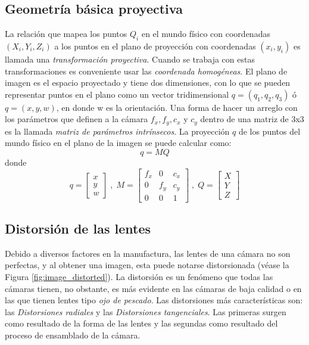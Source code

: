 \documentclass{book}
\begin{document}
\subsection{Geometría básica proyectiva}
La relación que mapea los puntos $Q_{i}$ en el mundo físico con coordenadas $(X_{i},Y_{i},Z_{i})$ a los puntos en el plano de proyección con coordenadas $(x_{i},y_{i})$ es llamada una \textit{transformación proyectiva}. Cuando se trabaja con estas transformaciones es conveniente usar las \textit{coordenada homogéneas}. El plano de imagen es el espacio proyectado y tiene dos dimensiones, con lo que se pueden representar puntos en el plano como un vector tridimensional $q=(q_{1},q_{2},q_{3})$ ó $q=(x, y, w)$, en donde w es la orientación. Una forma de hacer un arreglo con los parámetros que definen a la cámara $f_{x},f_{y},c_{x}$ y $c_{y}$ dentro de una matriz de 3x3 es la llamada \textit{matriz de parámetros intrínsecos}. La proyección $q$ de los puntos del mundo físico en el plano de la imagen se puede calcular como: 
\[q=MQ\]
donde
\[q=
\begin{bmatrix}
x\\ 
y\\
w 
\end{bmatrix}\;,\;M=
\begin{bmatrix}
f_{x} & 0 & c_{x}\\ 
0     &f_{y}&c_{y} \\
0     & 0 & 1
\end{bmatrix}\;,\;Q=
\begin{bmatrix}
X\\
Y\\
Z
\end{bmatrix}
\]
\subsection{Distorsión de las lentes}

Debido a diversos factores en la manufactura, las lentes de una cámara no son perfectas, y al obtener una imagen, esta puede notarse distorsionada (véase la Figura \ref{fig:image_distorted}). La distorsión es un fenómeno que todas las cámaras tienen, no obstante, es más evidente en las cámaras de baja calidad o en las que tienen lentes tipo \textit{ojo de pescado}. Las distorsiones más características son: las \textit{Distorsiones radiales} y las \textit{Distorsiones tangenciales}. Las primeras surgen como resultado de la forma de las lentes y las segundas como resultado del proceso de ensamblado de la cámara.
\end{document}
